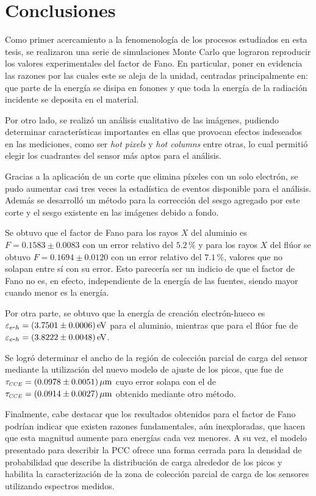 \chapter{Conclusiones}
\noindent Como primer acercamiento a la fenomenología de los procesos estudiados en esta tesis, se realizaron una serie de simulaciones Monte Carlo que lograron reproducir los valores experimentales del factor de Fano. En particular, poner en evidencia las razones por las cuales este se aleja de la unidad, centradas principalmente en: que parte de la energía se disipa en fonones y que toda la energía de la radiación incidente se deposita en el material.

Por otro lado, se realizó un análisis cualitativo de las imágenes, pudiendo determinar características importantes en ellas que provocan efectos indeseados en las mediciones, como ser \textit{hot pixels} y \textit{hot columns} entre otras, lo cual permitió elegir los cuadrantes del sensor más aptos para el análisis.

Gracias a la aplicación de un corte que elimina píxeles con un solo electrón, se pudo aumentar casi tres veces la estadística de eventos disponible para el análisis. Además se desarrolló un método para la corrección del sesgo agregado por este corte y el sesgo existente en las imágenes debido a fondo.

Se obtuvo que el factor de Fano para los rayos $X$ del aluminio es $F = 0.1583 \pm 0.0083 $ con un error relativo del $5.2\,\%$ y para los rayos $X$ del flúor se obtuvo $F = 0.1694 \pm 0.0120$ con un error relativo del $7.1\,\%$, valores que no solapan entre sí con su error. Esto parecería ser un indicio de que el factor de Fano no es, en efecto, independiente de la energía de las fuentes, siendo mayor cuando menor es la energía.

Por otra parte, se obtuvo que la energía de creación electrón-hueco es $\varepsilon_{\eh}=(3.7501\pm0.0006)\,\si{eV}$ para el aluminio, mientras que para el flúor fue de $\varepsilon_{\eh}=(3.8222\pm0.0048)\,\si{eV}$.

Se logró determinar el ancho de la región de colección parcial de carga del sensor mediante la utilización del nuevo modelo de ajuste de los picos, que fue de $\tau_{\scaleto{CCE}{4pt}}=(0.0978\pm 0.0051)\,\si{\mu m}$ cuyo error solapa con el de $\tau_{\scaleto{CCE}{4pt}}=(0.0914\pm 0.0027)\,\si{\mu m} $ obtenido mediante otro método\cite{PCC-CCE}.

Finalmente, cabe destacar que los resultados obtenidos para el factor de Fano podrían indicar que existen razones fundamentales, aún inexploradas, que hacen que esta magnitud aumente para energías cada vez menores. A su vez, el modelo presentado para describir la PCC ofrece una forma cerrada para la densidad de probabilidad que describe la distribución de carga alrededor de los picos y habilita la caracterización de la zona de colección parcial de carga de los sensores utilizando espectros medidos. 
